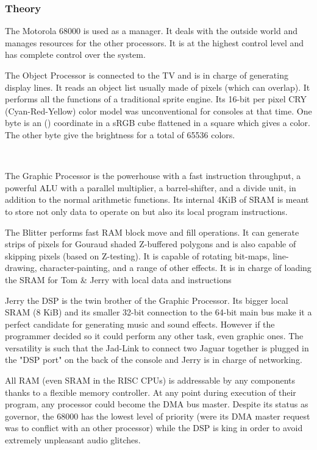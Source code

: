 \subsubsection{Theory}
\par
The Motorola 68000 is used as a manager. It deals with the outside world and manages resources for the other processors. It is at the highest control level and has complete control over the system.\\
\par
The Object Processor is connected to the TV and is in charge of generating display lines. It reads an object list usually made of pixels (which can overlap). It performs all the functions of a traditional sprite engine. Its 16-bit per pixel CRY (Cyan-Red-Yellow) color model was unconventional for consoles at that time. One byte is an () coordinate in a sRGB cube flattened in a square which gives a color. The other byte give the brightness for a total of 65536 colors.\\
\par
{}\\
\par

\par
The Graphic Processor is the powerhouse with a fast instruction throughput, a powerful ALU with a
parallel multiplier, a barrel-shifter, and a divide unit, in addition to the normal arithmetic functions. Its internal 4KiB of SRAM is meant to store not only data to operate on but also its local program instructions.\\
\par
The Blitter performs fast RAM block move and fill operations. It can generate strips of pixels for Gouraud shaded Z-buffered polygons and is also capable of skipping pixels (based on Z-testing). It is capable of rotating bit-maps, line-drawing, character-painting, and a range of other effects. It is in charge of loading the SRAM for Tom \& Jerry with local data and instructions\\
\par
Jerry the DSP is the twin brother of the Graphic Processor. Its bigger local SRAM (8 KiB) and its smaller 32-bit connection to the 64-bit main bus make it a perfect candidate for generating music and sound effects. However if the programmer decided so it could perform any other task, even graphic ones. The versatility is such that the Jad-Link to connect two Jaguar together is plugged in the "DSP port" on the back of the console and Jerry is in charge of networking.\\
\par
All RAM (even SRAM in the RISC CPUs) is addressable by any components thanks to a flexible memory controller. At any point during execution of their program, any processor could become the DMA bus master. Despite its status as governor, the 68000 has the lowest level of priority (were its DMA master request was to conflict with an other processor) while the DSP is king in order to avoid extremely unpleasant audio glitches.
\par



